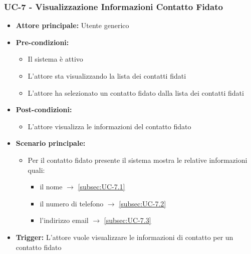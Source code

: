 \documentclass[a4paper,12pt]{article}
\begin{document}
\subsubsection{UC-7 - Visualizzazione Informazioni Contatto Fidato} \label{subsec:UC-7}
\begin{itemize}
    \item \textbf{Attore principale:} Utente generico
    \item \textbf{Pre-condizioni:} 
    \begin{itemize}
        \item Il sistema è attivo
        \item L'attore sta visualizzando la lista dei contatti fidati
        \item L'attore ha selezionato un contatto fidato dalla lista dei contatti fidati
    \end{itemize}
    \item \textbf{Post-condizioni:}
    \begin{itemize}
        \item L'attore visualizza le informazioni del contatto fidato
    \end{itemize}
    \item \textbf{Scenario principale:} 
    \begin{itemize}
        \item Per il contatto fidato presente il sistema mostra le relative informazioni quali:
        \begin{itemize}
            \item il nome $\rightarrow$ \ref{subsec:UC-7.1}
            \item il numero di telefono $\rightarrow$ \ref{subsec:UC-7.2}
            \item l'indirizzo email $\rightarrow$ \ref{subsec:UC-7.3}
        \end{itemize}
    \end{itemize}
    \item \textbf{Trigger:} L'attore vuole visualizzare le informazioni di contatto per un contatto fidato
\end{itemize}
\end{document}
